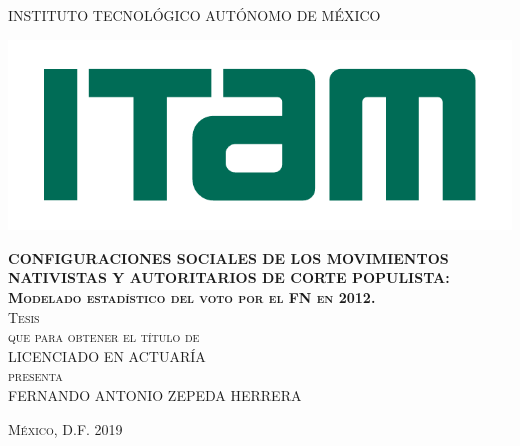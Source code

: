 \begin{titlepage}

\begin{center}

\large{INSTITUTO TECNOLÓGICO AUTÓNOMO DE MÉXICO}\\

\begin{center}
	\includegraphics[scale=0.8]{Figs/logo-ITAM.pdf}
\end{center}

\textsc{\large \textbf{CONFIGURACIONES SOCIALES DE LOS MOVIMIENTOS NATIVISTAS Y AUTORITARIOS DE CORTE POPULISTA: Modelado estadístico del voto por el FN en 2012.}}\\[2em]

\textsc{\large Tesis}\\[1em]

\textsc{que para obtener el título de}\\[1em]

\textsc{LICENCIADO EN ACTUARÍA}\\[1em]

\textsc{presenta}\\[1em]

\textsc{\Large FERNANDO ANTONIO ZEPEDA HERRERA}\\[1em]

\end{center}

\vspace*{\fill}
\textsc{México, D.F. \hspace*{\fill} 2019}

\end{titlepage}